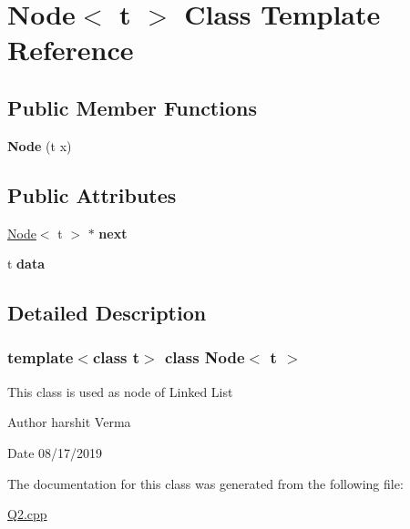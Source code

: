 \hypertarget{classNode}{}\section{Node$<$ t $>$ Class Template Reference}
\label{classNode}
\subsection*{Public Member Functions}
\begin{DoxyCompactItemize}
\item 
\mbox{\label{classNode_a3351e3648219017a059775a6ccf1f506}} 
{\bfseries Node} (t x)
\end{DoxyCompactItemize}
\subsection*{Public Attributes}
\begin{DoxyCompactItemize}
\item 
\mbox{\label{classNode_ac198c47df1d1d316a134a44ca337cca6}} 
\hyperlink{classNode}{Node}$<$ t $>$ $\ast$ {\bfseries next}
\item 
\mbox{\label{classNode_a9101049287e9247937cae6fd720814cc}} 
t {\bfseries data}
\end{DoxyCompactItemize}


\subsection{Detailed Description}
\subsubsection*{template$<$class t$>$\newline
class Node$<$ t $>$}

This class is used as node of Linked List \begin{DoxyAuthor}{Author}
harshit Verma 
\end{DoxyAuthor}
\begin{DoxyDate}{Date}
08/17/2019 
\end{DoxyDate}


The documentation for this class was generated from the following file\+:\begin{DoxyCompactItemize}
\item 
\hyperlink{Q2_8cpp}{Q2.\+cpp}\end{DoxyCompactItemize}
